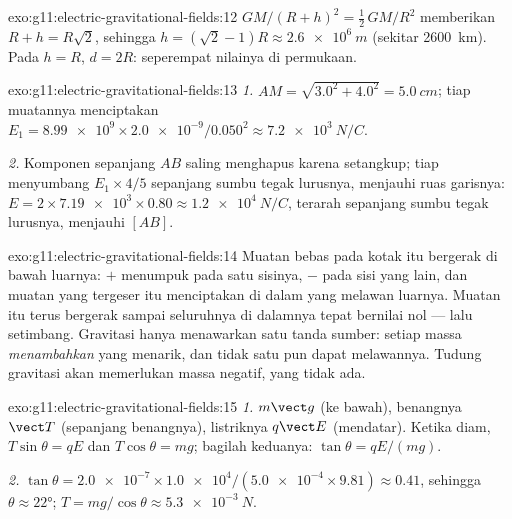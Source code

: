 \begin{solution}{exo:g11:electric-gravitational-fields:12}
$GM/(R+h)^2 = \tfrac12\,GM/R^2$ memberikan $R + h = R\sqrt{2}$,
sehingga $h = (\sqrt{2} - 1)R \approx \qty{2.6e6}{m}$ (sekitar
\qty{2600}{km}). Pada $h = R$, $d = 2R$: seperempat nilainya di
permukaan.
\end{solution}

\begin{solution}{exo:g11:electric-gravitational-fields:13}
\emph{1.} $AM = \sqrt{3.0^2 + 4.0^2} = \qty{5.0}{cm}$; tiap muatannya
menciptakan $E_1 = \num{8.99e9} \times \num{2.0e-9} / 0.050^2
\approx \qty{7.2e3}{N/C}$.

\emph{2.} Komponen sepanjang $AB$ saling menghapus karena setangkup;
tiap  menyumbang $E_1 \times 4/5$ sepanjang sumbu tegak
lurusnya, menjauhi ruas garisnya:
$E = 2 \times \num{7.19e3} \times 0.80 \approx \qty{1.2e4}{N/C}$,
terarah sepanjang sumbu tegak lurusnya, menjauhi $[AB]$.
\end{solution}

\begin{solution}{exo:g11:electric-gravitational-fields:14}
Muatan bebas pada kotak itu bergerak di bawah  luarnya: $+$
menumpuk pada satu sisinya, $-$ pada sisi yang lain, dan muatan yang
tergeser itu menciptakan  di dalam yang melawan  luarnya.
Muatan itu terus bergerak sampai  seluruhnya di dalamnya tepat
bernilai nol --- lalu setimbang. Gravitasi hanya menawarkan satu tanda
sumber: setiap massa \emph{menambahkan}  yang menarik, dan tidak
satu pun dapat melawannya. Tudung gravitasi akan memerlukan massa
negatif, yang tidak ada.
\end{solution}

\begin{solution}{exo:g11:electric-gravitational-fields:15}
\emph{1.}  $m\vect g$ (ke bawah),  benangnya $\vect T$
(sepanjang benangnya),  listriknya $q\vect E$ (mendatar). Ketika
diam, $T\sin\theta = qE$ dan $T\cos\theta = mg$; bagilah keduanya:
$\tan\theta = qE/(mg)$.

\emph{2.} $\tan\theta = \num{2.0e-7} \times \num{1.0e4} /
(\num{5.0e-4} \times 9.81) \approx 0.41$, sehingga
$\theta \approx \ang{22}$; $T = mg/\cos\theta \approx \qty{5.3e-3}{N}$.
\end{solution}

